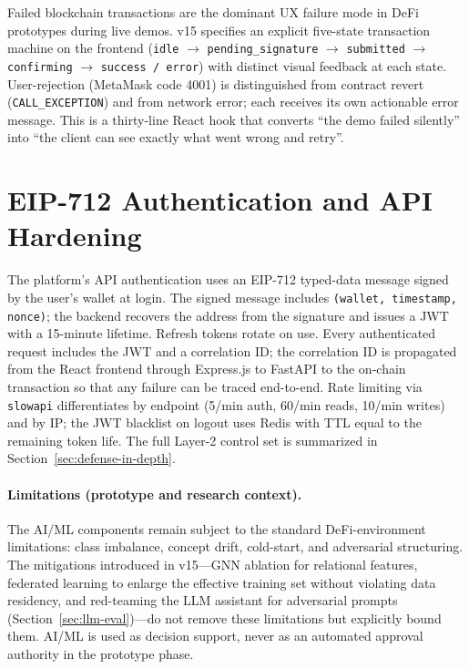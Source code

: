 \documentclass[12pt,a4paper]{report}
\begin{document}
Failed blockchain transactions are the dominant UX failure mode in DeFi prototypes during live demos. v15 specifies an explicit five-state transaction machine on the frontend (\texttt{idle} $\to$ \texttt{pending\_signature} $\to$ \texttt{submitted} $\to$ \texttt{confirming} $\to$ \texttt{success / error}) with distinct visual feedback at each state. User-rejection (MetaMask code 4001) is distinguished from contract revert (\texttt{CALL\_EXCEPTION}) and from network error; each receives its own actionable error message. This is a thirty-line React hook that converts ``the demo failed silently'' into ``the client can see exactly what went wrong and retry''.

\section{EIP-712 Authentication and API Hardening}
\label{sec:eip712-auth}

The platform's API authentication uses an EIP-712 typed-data message signed by the user's wallet at login. The signed message includes \texttt{(wallet, timestamp, nonce)}; the backend recovers the address from the signature and issues a JWT with a 15-minute lifetime. Refresh tokens rotate on use. Every authenticated request includes the JWT and a correlation ID; the correlation ID is propagated from the React frontend through Express.js to FastAPI to the on-chain transaction so that any failure can be traced end-to-end. Rate limiting via \texttt{slowapi} differentiates by endpoint (5/min auth, 60/min reads, 10/min writes) and by IP; the JWT blacklist on logout uses Redis with TTL equal to the remaining token life. The full Layer-2 control set is summarized in Section~\ref{sec:defense-in-depth}.

\paragraph{Limitations (prototype and research context).}
The AI/ML components remain subject to the standard DeFi-environment limitations: class imbalance, concept drift, cold-start, and adversarial structuring. The mitigations introduced in v15---GNN ablation for relational features, federated learning to enlarge the effective training set without violating data residency, and red-teaming the LLM assistant for adversarial prompts (Section~\ref{sec:llm-eval})---do not remove these limitations but explicitly bound them. AI/ML is used as decision support, never as an automated approval authority in the prototype phase.
\end{document}
